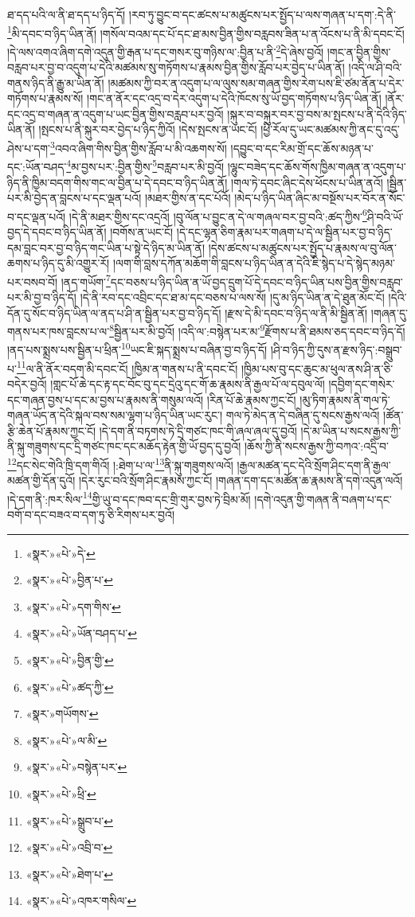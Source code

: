 ཐ་དད་པའི་ལ་ནི་ཐ་དད་པ་ཉིད་དོ། །རབ་ཏུ་བྱུང་བ་དང་ཚངས་པ་མཚུངས་པར་སྤྱོད་པ་ལས་གཞན་པ་དག་:དེ་ནི་\footnote{«སྣར་»«པེ་»དེ་}མི་དབང་བ་ཉིད་ཡིན་ནོ། །གསོལ་བའམ་དང་པོ་དང་ཐ་མས་བྱིན་གྱིས་བརླབས་ཟིན་པ་ན་འོངས་པ་ནི་མི་དབང་ངོ། །དེ་ལས་འགའ་ཞིག་དགེ་འདུན་གྱི་རྒན་པ་དང་གསར་བུ་གཉིས་ལ་:བྱིན་པ་ནི་\footnote{«སྣར་»«པེ་»བྱིན་པ་}དེ་ཞེས་བྱའོ། །གང་ན་བྱིན་གྱིས་བརླབ་པར་བྱ་བ་འདུག་པ་དེའི་མཚམས་སུ་གཏོགས་པ་རྣམས་བྱིན་གྱིས་རློབ་པར་བྱེད་པ་ཡིན་ནོ། །འདི་ལ་ཤི་བའི་གནས་ཉིད་ནི་རྒྱུ་མ་ཡིན་ནོ། །མཚམས་ཀྱི་བར་ན་འདུག་པ་ལ་ལུས་སམ་གཞན་གྱིས་རེག་པས་ཇི་ཙམ་ནོན་པ་དེར་གཏོགས་པ་རྣམས་སོ། །གང་ན་ནོར་དང་འདྲ་བ་དེར་འདུག་པ་དེའི་ཁོངས་སུ་ཡོ་བྱད་གཏོགས་པ་ཉིད་ཡིན་ནོ། །ནོར་དང་འདྲ་བ་གཞན་ན་འདུག་པ་ཡང་བྱིན་གྱིས་བརླབ་པར་བྱའོ། །སྐུར་བ་བསྐུར་བར་བྱ་བས་མ་སྤངས་པ་ནི་དེའི་ཉིད་ཡིན་ནོ། །སྤངས་པ་ནི་སྐུར་བར་བྱེད་པ་ཉིད་ཀྱིའོ། །དེས་སྤངས་ན་ཡང་ངོ། །ཕྱི་རོལ་དུ་ཡང་མཚམས་ཀྱི་ནང་དུ་འདུ་ཤེས་པ་དག་\footnote{«སྣར་»«པེ་»དག་གིས་}འབའ་ཞིག་གིས་བྱིན་གྱིས་རློབ་པ་མི་འཆགས་སོ། །དབྱུང་བ་དང་རིམ་གྲོ་དང་ཆོས་མཉན་པ་དང་:ཡོན་བཤད་\footnote{«སྣར་»«པེ་»ཡོན་བཤད་པ་}མ་བྱས་པར་:བྱིན་གྱིས་\footnote{«སྣར་»«པེ་»བྱིན་གྱི་}བརླབ་པར་མི་བྱའོ། །ལྷུང་བཟེད་དང་ཆོས་གོས་ཁྱིམ་གཞན་ན་འདུག་པ་ཉིད་ནི་ཁྱིམ་བདག་གིས་གང་ལ་བྱིན་པ་དེ་དབང་བ་ཉིད་ཡིན་ནོ། །གལ་ཏེ་དབང་ཞིང་དེས་ཕོངས་པ་ཡིན་ནའོ། །སྦྱིན་པར་མི་བྱེད་ན་བླངས་པ་དང་ལྡན་པའོ། །མཐར་གྱིས་ན་དང་པོའོ། །མེད་པ་ཉིད་ཡིན་ཞིང་མ་བསྔོས་པར་བོར་ན་སོང་བ་དང་ལྡན་པའོ། །དེ་ནི་མཐར་གྱིས་དང་འདྲའོ། །བུ་ལོན་པ་བྱུང་ན་དེ་ལ་གཞལ་བར་བྱ་བའི་:ཚད་ཀྱིས་\footnote{«སྣར་»«པེ་»ཚད་ཀྱི་}ཤི་བའི་ཡོ་བྱད་དེ་དབང་བ་ཉིད་ཡིན་ནོ། །བགོས་ན་ཡང་ངོ། །དེ་དང་ལྷན་ཅིག་རྣམ་པར་གཞག་པ་དེ་ལ་སྦྱིན་པར་བྱ་བ་ཉིད་དམ་བླང་བར་བྱ་བ་ཉིད་གང་ཡིན་པ་སྟེ་དེ་ཉིད་མ་ཡིན་ནོ། །དེས་ཚངས་པ་མཚུངས་པར་སྤྱོད་པ་རྣམས་ལ་བུ་ལོན་ཆགས་པ་ཉིད་དུ་མི་འགྱུར་རོ། །ལག་གི་བླས་དཀོན་མཆོག་གི་བླངས་པ་ཉིད་ཡིན་ན་དེའི་ཇི་སྙེད་པ་དེ་སྙེད་མཉམ་པར་བསབ་བོ། །ནད་གཡོག་\footnote{«སྣར་»གཡོགས་}དང་བཅས་པ་ཉིད་ཡིན་ན་ཡོ་བྱད་དྲུག་པོ་དེ་དབང་བ་ཉིད་ཡིན་པས་བྱིན་གྱིས་བརླབ་པར་མི་བྱ་བ་ཉིད་དོ། །དེ་ནི་རབ་དང་འབྲིང་དང་ཐ་མ་དང་བཅས་པ་ལས་སོ། །དུ་མ་ཉིད་ཡིན་ན་དེ་ཐུན་མོང་ངོ། །དེའི་དོན་དུ་སོང་བ་ཉིད་ཡིན་ལ་ནད་པ་ཤི་ན་སྦྱིན་པར་བྱ་བ་ཉིད་དོ། །རྫས་དེ་མི་དབང་བ་ཉིད་ལ་ནི་མི་སྦྱིན་ནོ། །གཞན་དུ་གནས་པར་ཁས་བླངས་པ་ལ་\footnote{«སྣར་»«པེ་»ལ་མི་}སྦྱིན་པར་མི་བྱའོ། །འདི་ལ་:བསྙེན་པར་མ་\footnote{«སྣར་»«པེ་»བསྙེན་པར་}རྫོགས་པ་ནི་ཐམས་ཅད་དབང་བ་ཉིད་དོ། །ནད་པས་སྨྲས་པས་སྦྱིན་པ་ཕྲིན་\footnote{«སྣར་»«པེ་»ཕྲི་}ཡང་ཇི་སྐད་སྨྲས་པ་བཞིན་བྱ་བ་ཉིད་དོ། །ཤི་བ་ཉིད་ཀྱི་དུས་ན་རྫས་ཉིད་:བསྒྲུབ་པ་\footnote{«སྣར་»«པེ་»སྒྲུབ་པ་}ལ་ནི་ནོར་བདག་མི་དབང་ངོ། །ཁྱིམ་ན་གནས་པ་ནི་དབང་ངོ། །ཁྱིམ་པས་བུ་དང་ཆུང་མ་ཕུལ་ནས་ཤི་ན་ཅི་བདེར་བྱའོ། །གླང་པོ་ཆེ་དང་རྟ་དང་བོང་བུ་དང་དྲེའུ་དང་གོ་ཆ་རྣམས་ནི་རྒྱལ་པོ་ལ་དབུལ་ལོ། །དབྱིག་དང་གསེར་དང་གཞན་བྱས་པ་དང་མ་བྱས་པ་རྣམས་ནི་གསུམ་ལའོ། །རིན་པོ་ཆེ་རྣམས་ཀྱང་ངོ། །མུ་ཏིག་རྣམས་ནི་གལ་ཏེ་གཞན་ཡོད་ན་དེའི་སྐལ་བས་སམ་ལྷག་པ་ཉིད་ཡིན་ཡང་རུང་། གལ་ཏེ་མེད་ན་དེ་བཞིན་དུ་སངས་རྒྱས་ལའོ། །ཚོན་རྩི་ཆེན་པོ་རྣམས་ཀྱང་ངོ། །དེ་དག་ནི་བཏགས་ཏེ་དྲི་གཙང་ཁང་གི་ཞལ་ཞལ་དུ་བྱའོ། །དེ་མ་ཡིན་པ་སངས་རྒྱས་ཀྱི་ནི་སྐུ་གཟུགས་དང་དྲི་གཙང་ཁང་དང་མཆོད་རྟེན་གྱི་ཡོ་བྱད་དུ་བྱའོ། །ཆོས་ཀྱི་ནི་སངས་རྒྱས་ཀྱི་བཀའ་:འདྲི་བ་\footnote{«སྣར་»«པེ་»འབྲི་བ་}དང་སེང་གེའི་ཁྲི་དག་གིའོ། །:ཐེག་པ་ལ་\footnote{«སྣར་»«པེ་»ཐེག་པ་}ནི་སྐུ་གཟུགས་ལའོ། །རྒྱལ་མཚན་དང་དེའི་སྲོག་ཤིང་དག་ནི་རྒྱལ་མཚན་གྱི་དོན་དུའོ། །དེར་རུང་བའི་སྲོག་ཤིང་རྣམས་ཀྱང་ངོ། །གཞན་དག་དང་མཚོན་ཆ་རྣམས་ནི་དགེ་འདུན་ལའོ། །དེ་དག་ནི་:ཁར་སིལ་\footnote{«སྣར་»«པེ་»འཁར་གསིལ་}གྱི་ཡུ་བ་དང་ཁབ་དང་གྲི་གུར་བྱས་ཏེ་བྲིམ་མོ། །དགེ་འདུན་གྱི་གཞན་ནི་བཞག་པ་དང་བགོ་བ་དང་བཟའ་བ་དག་ཏུ་ཅི་རིགས་པར་བྱའོ། 